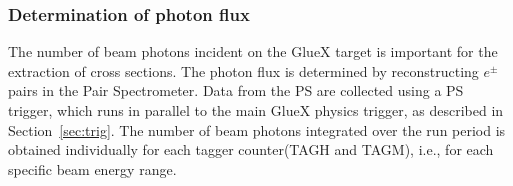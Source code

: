 %
%
%
%

\subsubsection{Determination of photon flux         \label{sec:ps_flux}}
The number of beam photons incident on 
the GlueX target is important for the extraction of cross sections. The photon flux is determined by reconstructing
$e^\pm$ pairs in the Pair Spectrometer. Data from the PS are 
collected using a PS trigger, which  runs in parallel to the 
main GlueX physics trigger, as described in Section~\ref{sec:trig}.
The number of beam photons integrated over the run period is obtained
individually for each tagger counter(TAGH and TAGM), i.e., for
each specific beam energy range. 


